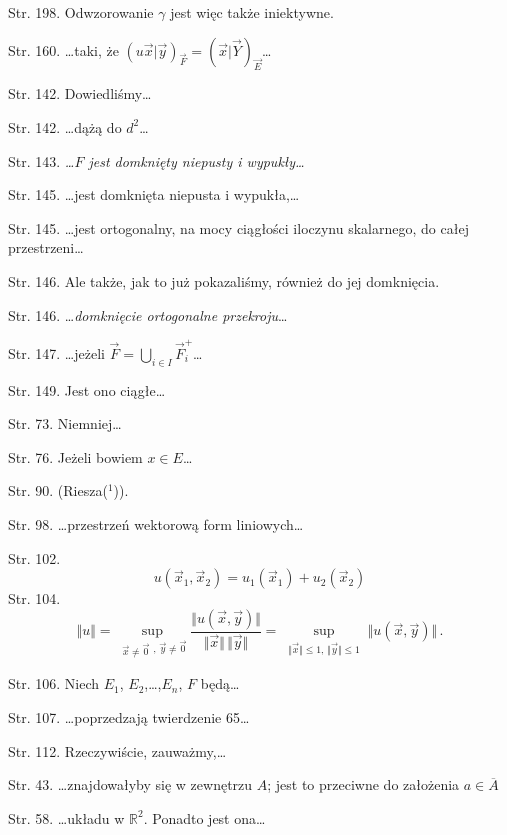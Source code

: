 \documentclass[a4paper,11pt]{article}
\begin{document}
\start Str. 198. Odwzorowanie $\gamma$ jest więc także iniektywne.

\start Str. 160. \ldots taki, że
$( u\vec{ x } | \vec{ y } )_{ \vec{ F } } = ( \vec{ x } | \vec{ Y }
)_{ \vec{ E } }$\ldots

\start Str. 142. Dowiedliśmy\ldots

\start Str. 142. \ldots dążą do $d^{ 2 }$\ldots

\start Str. 143. \emph{\ldots$F$ jest domknięty niepusty i
  wypukły\ldots}

\start Str. 145. \ldots jest domknięta niepusta i wypukła,\ldots

\start Str. 145. \ldots jest ortogonalny, na mocy ciągłości iloczynu
skalarnego, do całej przestrzeni\ldots

\start Str. 146. Ale także, jak to już pokazaliśmy, również do jej
domknięcia.

\start Str. 146. \ldots\emph{domknięcie ortogonalne przekroju}\ldots

\start Str. 147. \ldots jeżeli
$\vec{ F } = \bigcup_{ i \in I } \vec{ F }_{ i }^{ + }$\ldots

\start Str. 149. Jest ono ciągłe\ldots

\start Str. 73. Niemniej\ldots

\start Str. 76. Jeżeli bowiem $x \in E$\ldots

\start Str. 90. \large{(Riesza($^{ 1 }$))}.

\start Str. 98. \ldots przestrzeń wektorową form liniowych\ldots

\start Str. 102.
$$u(\vec{x}_{1},\vec{x}_{2})=u_{1}(\vec{x}_{1})+u_{2}(\vec{x}_{2})$$
\start Str. 104.
$$\Vert u \Vert = \sup_{ \substack{ \vec{ x } \neq \vec{ 0 } },
  \,\vec{ y } \neq \vec{ 0 } } \frac{ \Vert u( \vec x, \vec y ) \Vert
}{ \Vert \vec{ x } \Vert \, \Vert \vec y \Vert } = \sup_{ \substack{
    \Vert \vec{ x } \Vert \leq 1, \, \Vert \vec{ y } \Vert \leq 1 } }
\Vert u( \vec x, \vec y ) \Vert \, .$$

\start Str. 106. Niech $E_{ 1 }$, $E_{ 2 }$,\ldots,$E_{ n }$, $F$
będą\ldots

\start Str. 107. \ldots poprzedzają twierdzenie 65\ldots

\start Str. 112. Rzeczywiście, zauważmy,\ldots

\start Str. 43. \ldots znajdowałyby się w zewnętrzu $A$; jest to
przeciwne do założenia $a \in \overline{ A }$

\start Str. 58. \ldots układu w $\mathbb{R}^{ 2 }$. Ponadto jest
ona\ldots
\end{document}
